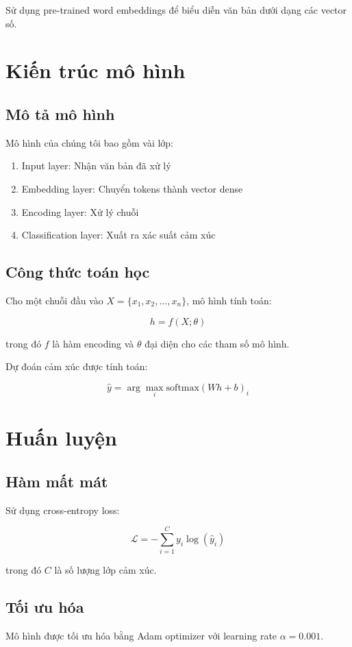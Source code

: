Sử dụng pre-trained word embeddings để biểu diễn văn bản dưới dạng các vector số.

\section{Kiến trúc mô hình}

\subsection{Mô tả mô hình}

Mô hình của chúng tôi bao gồm vài lớp:

\begin{enumerate}
    \item Input layer: Nhận văn bản đã xử lý
    \item Embedding layer: Chuyển tokens thành vector dense
    \item Encoding layer: Xử lý chuỗi
    \item Classification layer: Xuất ra xác suất cảm xúc
\end{enumerate}

\subsection{Công thức toán học}

Cho một chuỗi đầu vào $X = \{x_1, x_2, \ldots, x_n\}$, mô hình tính toán:

\begin{equation}
h = f(X; \theta)
\end{equation}

trong đó $f$ là hàm encoding và $\theta$ đại diện cho các tham số mô hình.

Dự đoán cảm xúc được tính toán:

\begin{equation}
\hat{y} = \arg\max_i \text{softmax}(W h + b)_i
\end{equation}

\section{Huấn luyện}

\subsection{Hàm mất mát}

Sử dụng cross-entropy loss:

\begin{equation}
\mathcal{L} = -\sum_{i=1}^{C} y_i \log(\hat{y}_i)
\end{equation}

trong đó $C$ là số lượng lớp cảm xúc.

\subsection{Tối ưu hóa}

Mô hình được tối ưu hóa bằng Adam optimizer với learning rate $\alpha = 0.001$.
